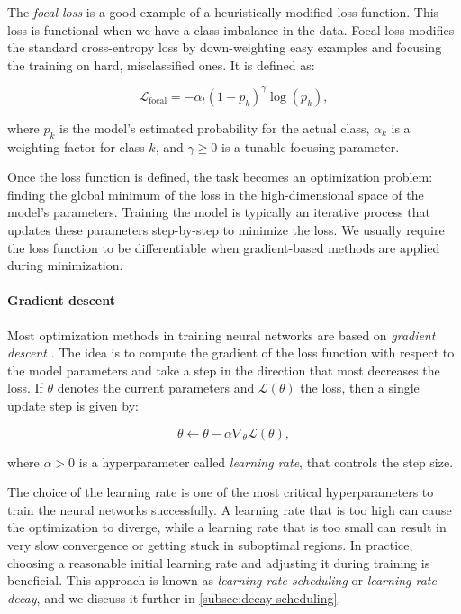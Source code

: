 The \emph{focal loss} \cite{lin2017focal} is a good example of a heuristically modified loss function. This loss is functional when we have a class imbalance in the data. Focal loss modifies the standard cross-entropy loss by down-weighting easy examples and focusing the training on hard, misclassified ones. It is defined as:

\begin{equation}
	\label{eq:focal_loss}
	\mathcal{L}_{\text{focal}} = -\alpha_t (1 - p_k)^\gamma \log(p_k),
\end{equation}

where $p_k$ is the model's estimated probability for the actual class, $\alpha_k$ is a weighting factor for class $k$, and $\gamma \geq 0$ is a tunable focusing parameter.

Once the loss function is defined, the task becomes an optimization problem: finding the global minimum of the loss in the high-dimensional space of the model's parameters. Training the model is typically an iterative process that updates these parameters step-by-step to minimize the loss. We usually require the loss function to be differentiable when gradient-based methods are applied during minimization.

\paragraph{Gradient descent}
Most optimization methods in training neural networks are based on \emph{gradient descent} \cite{bengio2017deep}. The idea is to compute the gradient of the loss function with respect to the model parameters and take a step in the direction that most decreases the loss. If $\theta$ denotes the current parameters and $\mathcal{L}(\theta)$ the loss, then a single update step is given by:

\begin{equation}
    \theta \leftarrow \theta - \alpha \nabla_\theta \mathcal{L}(\theta),
\end{equation}

where $\alpha > 0$ is a hyperparameter called \emph{learning rate}, that controls the step size. 

The choice of the learning rate is one of the most critical hyperparameters to train the neural networks successfully. A learning rate that is too high can cause the optimization to diverge, while a learning rate that is too small can result in very slow convergence or getting stuck in suboptimal regions. In practice, choosing a reasonable initial learning rate and adjusting it during training is beneficial. This approach is known as \emph{learning rate scheduling} or \emph{learning rate decay}, and we discuss it further in \ref{subsec:decay-scheduling}.

